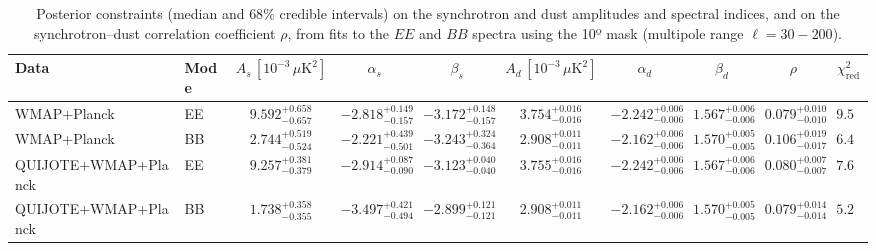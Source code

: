 \begin{table}[h]
\centering
\scriptsize
\setlength{\tabcolsep}{4pt}
\caption{Posterior constraints (median and $68\%$ credible intervals) on the synchrotron and dust amplitudes and spectral indices, and on the synchrotron--dust correlation coefficient $\rho$, from fits to the $EE$ and $BB$ spectra using the 10º mask (multipole range $\ell=30-200$).}
\label{tab:fit_results}
\begin{tabular}{llcccccccc}
\toprule
Data & Mode & $A_s\,[10^{-3}\,\mu\mathrm{K}^2]$ & $\alpha_s$ & $\beta_s$ & $A_d\,[10^{-3}\,\mu\mathrm{K}^2]$ & $\alpha_d$ & $\beta_d$ & $\rho$ & $\chi^2_\mathrm{red}$ \\
\midrule
WMAP+Planck & EE & $9.592^{+0.658}_{-0.657}$ & $-2.818^{+0.149}_{-0.157}$ & $-3.172^{+0.148}_{-0.157}$ & $3.754^{+0.016}_{-0.016}$ & $-2.242^{+0.006}_{-0.006}$ & $1.567^{+0.006}_{-0.006}$ & $0.079^{+0.010}_{-0.010}$ & $9.56$ \\
WMAP+Planck & BB & $2.744^{+0.519}_{-0.524}$ & $-2.221^{+0.439}_{-0.501}$ & $-3.243^{+0.324}_{-0.364}$ & $2.908^{+0.011}_{-0.011}$ & $-2.162^{+0.006}_{-0.006}$ & $1.570^{+0.005}_{-0.005}$ & $0.106^{+0.019}_{-0.017}$ & $6.41$ \\
QUIJOTE+WMAP+Planck & EE & $9.257^{+0.381}_{-0.379}$ & $-2.914^{+0.087}_{-0.090}$ & $-3.123^{+0.040}_{-0.040}$ & $3.755^{+0.016}_{-0.016}$ & $-2.242^{+0.006}_{-0.006}$ & $1.567^{+0.006}_{-0.006}$ & $0.080^{+0.007}_{-0.007}$ & $7.61$ \\
QUIJOTE+WMAP+Planck & BB & $1.738^{+0.358}_{-0.355}$ & $-3.497^{+0.421}_{-0.494}$ & $-2.899^{+0.121}_{-0.121}$ & $2.908^{+0.011}_{-0.011}$ & $-2.162^{+0.006}_{-0.006}$ & $1.570^{+0.005}_{-0.005}$ & $0.079^{+0.014}_{-0.014}$ & $5.27$ \\
\bottomrule
\end{tabular}
\end{table}